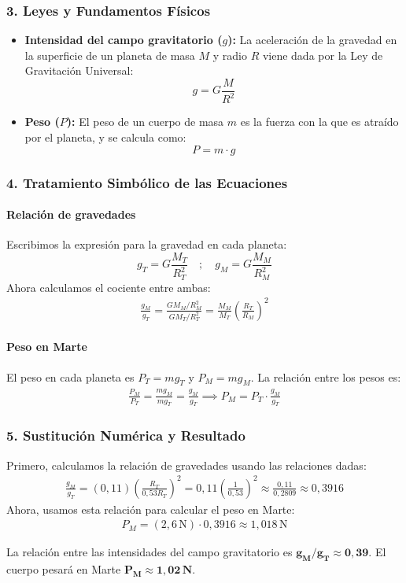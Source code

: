 \subsubsection*{3. Leyes y Fundamentos Físicos}
\begin{itemize}
    \item \textbf{Intensidad del campo gravitatorio ($g$):} La aceleración de la gravedad en la superficie de un planeta de masa $M$ y radio $R$ viene dada por la Ley de Gravitación Universal:
    $$ g = G\frac{M}{R^2} $$
    \item \textbf{Peso ($P$):} El peso de un cuerpo de masa $m$ es la fuerza con la que es atraído por el planeta, y se calcula como:
    $$ P = m \cdot g $$
\end{itemize}

\subsubsection*{4. Tratamiento Simbólico de las Ecuaciones}
\paragraph*{Relación de gravedades}
Escribimos la expresión para la gravedad en cada planeta:
$$ g_T = G\frac{M_T}{R_T^2} \quad ; \quad g_M = G\frac{M_M}{R_M^2} $$
Ahora calculamos el cociente entre ambas:
\begin{gather}
    \frac{g_M}{g_T} = \frac{G M_M / R_M^2}{G M_T / R_T^2} = \frac{M_M}{M_T} \left( \frac{R_T}{R_M} \right)^2
\end{gather}
\paragraph*{Peso en Marte}
El peso en cada planeta es $P_T=mg_T$ y $P_M=mg_M$. La relación entre los pesos es:
\begin{gather}
    \frac{P_M}{P_T} = \frac{mg_M}{mg_T} = \frac{g_M}{g_T} \implies P_M = P_T \cdot \frac{g_M}{g_T}
\end{gather}

\subsubsection*{5. Sustitución Numérica y Resultado}
Primero, calculamos la relación de gravedades usando las relaciones dadas:
\begin{gather}
    \frac{g_M}{g_T} = (0,11) \left( \frac{R_T}{0,53 R_T} \right)^2 = 0,11 \left( \frac{1}{0,53} \right)^2 \approx \frac{0,11}{0,2809} \approx 0,3916
\end{gather}
Ahora, usamos esta relación para calcular el peso en Marte:
\begin{gather}
    P_M = (2,6\,\text{N}) \cdot 0,3916 \approx 1,018\,\text{N}
\end{gather}
\begin{cajaresultado}
La relación entre las intensidades del campo gravitatorio es $\boldsymbol{g_M/g_T \approx 0,39}$. El cuerpo pesará en Marte $\boldsymbol{P_M \approx 1,02\,\textbf{N}}$.
\end{cajaresultado}

